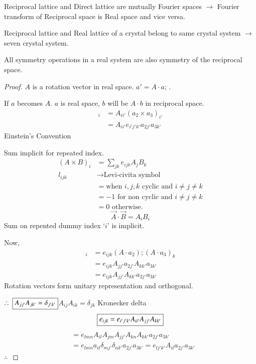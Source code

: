 Reciprocal lattice and Direct lattice are mutually Fourier spaces $\to$ Fourier transform of Reciprocal space is Real space and vice versa.

Reciprocal lattice and Real lattice of a crystal belong to same crystal system $\to$ seven crystal system.

All symmetry operations in a real system are also symmetry of the reciprocal space.

\begin{proof}
$A$ is a rotation vector in real space. $a'=A\cdot a$; .

If $a$ becomes $A$. $a$ is real space, $b$ will be $A\cdot b$ in reciprocal space.
\begin{align*}
[A(\overrightarrow{a}_{2}\times \overrightarrow{a}_{3})]_{i} &= A_{ii'}(a_{2}\times a_{3})_{i'}\\
&= A_{ii'}e_{i'j'k'}a_{2j'}a_{3k'}
\end{align*}
Einstein's Convention 

Sum implicit for repeated index.
\begin{align*}
(A\times B)_{i} &= \sum\limits_{jk}e_{ijk}A_{j}B_{k}\\
l_{ijk} &\to \text{Levi-civita symbol}\\
&= \text{when } i,j,k\text{ cyclic and } i\neq j\neq k\\
&= -1\text{ for non cyclic and } i\neq j\neq k\\
&= 0\text{ otherwise.}
\end{align*}
$$
\overrightarrow{A}\cdot \overrightarrow{B}=A_{i}B_{i}
$$
Sum on repented dummy index `$i$' is implicit.

Now,
\begin{align*}
[(A\cdot a_{2})\times (A\cdot a_{3})]_{i} &= e_{ijk}(A\cdot a_{2}); (A\cdot a_{3})_{k}\\
&= e_{ijk}A_{jj'}a_{2j'}A_{kk'}a_{3k'}\\
&= e_{ijk}A_{jj'}A_{kk'}a_{2j'}a_{3k'}
\end{align*}
Rotation vectors form unitary representation and orthogonal.

$\therefore \ \fbox{$A_{jj'}A_{jk'}=\delta_{j'k'}$}$\quad $A_{ij}A_{ik}=\delta_{jk}$ Kronecker delta
$$
\fbox{$e_{ijk}=e_{i'j'k'}A_{ii'}A_{jj'}A_{kk'}$}
$$
\begin{align*}
&= e_{lmn}A_{il}A_{jm}A_{jj'}A_{kn}A_{kk'}a_{2j'}a_{3k'}\\
&= e_{lmn}a_{il}\delta_{mj'}\delta_{nk'}a_{2j'}a_{3k'}=e_{lj'k'}A_{il}a_{2j'}a_{3k'}
\end{align*}
$\therefore \ $ 


\end{proof}
